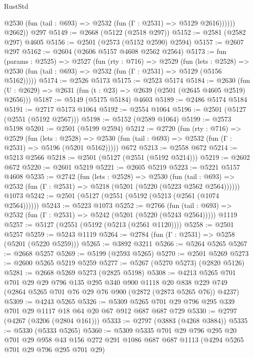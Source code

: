 \begin{lexlean}{RustStd}
\begin{coremodule}
              @2530 (fun (tail : @693) => @2532 (fun (Γ : @2531) => @5129 @2616))))))
        @2662))
    @297
@5149 := @2668 (@5122 (@2518 @297))
@5152 := @2581 (@2582 @297) @4605
@5156 := @2501 (@2573 (@5152 @2590) @2594)
@5157 := @2607 @297
@5162 := @2604 (@2606 @5157 @4608 @2562 @2564)
@5173 := fun (params : @2525) =>
  @2527
    (fun (rty : @716) =>
    @2529
      (fun (lets : @2528) =>
      @2530 (fun (tail : @693) => @2532 (fun (Γ : @2531) => @5129 (@5156 @5162)))))
@5174 := @2526 @5173
@5175 := @2523 @5174
@5184 := @2630 (fun (U : @2629) => @2631 (fun (t : @23) => @2639 (@2501 (@2645 @4605 @2519) @2656)))
@5187 := @5149 (@5175 @5184) @4603
@5189 := @2486 @5174 @5184
@5191 := @2717 @5173 @1064
@5192 := @2554 @1064
@5196 := @2501 (@5127 (@2551 (@5192 @2567)))
@5198 := @5152 (@2589 @1064)
@5199 := @2573 @5198
@5201 := @2501 (@5199 @2594)
@5212 := @2720
    (fun (rty : @716) =>
    @2529
      (fun (lets : @2528) =>
      @2530 (fun (tail : @693) => @2532 (fun (Γ : @2531) => @5196 (@5201 @5162)))))
    @672
@5213 := @2558 @672
@5214 := @5213 @2566
@5218 := @2501 (@5127 (@2551 (@5192 @5214)))
@5219 := @2602 @672
@5220 := @2601 @5219
@5221 := @2605 @5219
@5223 := @5221 @5157 @4608
@5235 := @2742
    (fun (lets : @2528) =>
    @2530
      (fun (tail : @693) => @2532 (fun (Γ : @2531) => @5218 (@5201 (@5220 (@5223 @2562 @2564))))))
    @1073
@5242 := @2501 (@5127 (@2551 (@5192 (@5213 (@2561 (@1074 @2564))))))
@5243 := @5223 @1073
@5252 := @2766
    (fun (tail : @693) => @2532 (fun (Γ : @2531) => @5242 (@5201 (@5220 (@5243 @2564)))))
    @1119
@5257 := @5127 (@2551 (@5192 (@5213 (@2561 @1120))))
@5258 := @2501 @5257
@5259 := @5243 @1119
@5264 := @2784 (fun (Γ : @2531) => @5258 (@5201 (@5220 @5259)))
@5265 := @3892 @3211
@5266 := @5264 @5265
@5267 := @2668 @5257
@5269 := @5199 (@2593 @5265)
@5270 := @2501 @5269
@5273 := @2600 @5265 @5219 @5259
@5277 := @5267 (@5270 @5273) (@2820 @5126)
@5281 := @2668 @5269 @5273 (@2825 @5198)
@5308 := @4213
    @5265
    @701
    @701
    @29
    @29
    @796
    @135
    @295
    @340
    @900
    @1118
    @20
    @838
    @229
    @749
    (@2864 @5265 @701 @76 @29 @76 @900 (@2872 (@2873 @5265 @76)) @4237)
@5309 := @4243 @5265
@5326 := @5309 @5265 @701 @29 @796 @295 @339 @701 @29 @1117 @18 @64 @20 @67 @912 @687 @687 @729
@5330 := @2797 (@4267 (@3206 (@2804 @161)))
@5333 := @2797 (@3883 (@4268 @3884))
@5335 := @5330 (@5333 @5265)
@5360 := @5309
    @5335
    @701
    @29
    @796
    @295
    @20
    @701
    @29
    @958
    @43
    @156
    @272
    @291
    @1086
    @687
    @687
    @1113
    (@4294 @5265 @701 @29 @796 @295 @701 @29)

\end{coremodule}
\end{lexlean}
